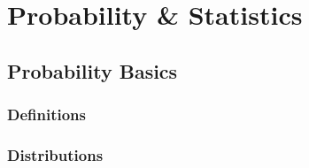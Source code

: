 \chapter{Probability \& Statistics}
\section{Probability Basics}


\subsection{Definitions}

\subsection{Distributions}

